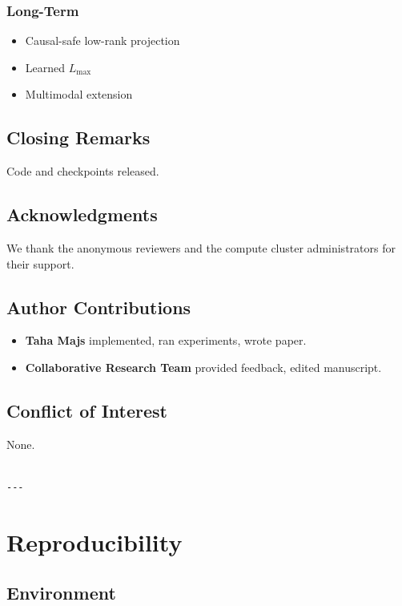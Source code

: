 \subsubsection{Long-Term}
\begin{itemize}
\item Causal-safe low-rank projection
\item Learned $L_\text{max}$
\item Multimodal extension

\end{itemize}
\subsection{Closing Remarks}

Code and checkpoints released.

\subsection{Acknowledgments}

We thank the anonymous reviewers and the compute cluster administrators for their support.

\subsection{Author Contributions}

\begin{itemize}
\item \textbf{Taha Majs} implemented, ran experiments, wrote paper.
\item \textbf{Collaborative Research Team} provided feedback, edited manuscript.

\end{itemize}
\subsection{Conflict of Interest}

None.
\begin{lstlisting}

---
\end{lstlisting}

\section{Reproducibility}

\subsection{Environment}

